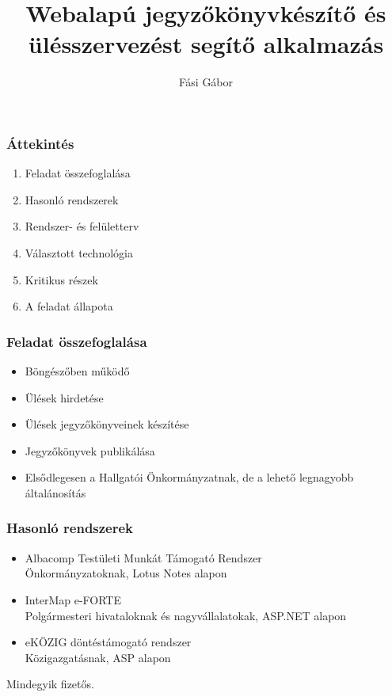 \documentclass[11pt]{beamer}
\title[Webalapú jegyzőkönyvkészítő és ülésszerv. segítő alk.\hspace{2em}\insertframenumber/\inserttotalframenumber]{Webalapú jegyzőkönyvkészítő és ülésszervezést segítő alkalmazás}
\author{Fási Gábor}
\institute{Konzulens: Dulai Tibor}
\date{}
\begin{document}
\frame{\titlepage}

\begin{frame}
    \frametitle{Áttekintés}
    \begin{enumerate}
        \item Feladat összefoglalása
        \item Hasonló rendszerek
        \item Rendszer- és felületterv
        \item Választott technológia
        \item Kritikus részek
        \item A feladat állapota
    \end{enumerate}
\end{frame}

\begin{frame}
    \frametitle{Feladat összefoglalása}
    
    \begin{itemize}
	    \item Böngészőben működő
	    \item Ülések hirdetése
	    \item Ülések jegyzőkönyveinek készítése
	    \item Jegyzőkönyvek publikálása
	    \item Elsődlegesen a Hallgatói Önkormányzatnak, de a lehető legnagyobb általánosítás
    \end{itemize}
\end{frame}

\begin{frame}
    \frametitle{Hasonló rendszerek}
    
    \begin{itemize}
        \item Albacomp Testületi Munkát Támogató Rendszer\\
            \small{Önkormányzatoknak, Lotus Notes alapon}
            
        \item InterMap e-FORTE\\
            \small{Polgármesteri hivataloknak és nagyvállalatokak, ASP.NET alapon}
            
        \item eKÖZIG döntéstámogató rendszer\\
            \small{Közigazgatásnak, ASP alapon}
    \end{itemize}
    
    Mindegyik fizetős.
\end{frame}
\end{document}
